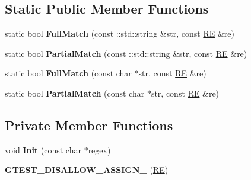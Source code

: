 \subsection*{Static Public Member Functions}
\begin{DoxyCompactItemize}
\item 
\mbox{\label{classtesting_1_1internal_1_1_r_e_aa79a950758d0f1d62f7762d1e9cefe86}} 
static bool {\bfseries Full\+Match} (const \+::std\+::string \&str, const \hyperlink{classtesting_1_1internal_1_1_r_e}{RE} \&re)
\item 
\mbox{\label{classtesting_1_1internal_1_1_r_e_a1e81f9a87211bdca645e025f8f0236c8}} 
static bool {\bfseries Partial\+Match} (const \+::std\+::string \&str, const \hyperlink{classtesting_1_1internal_1_1_r_e}{RE} \&re)
\item 
\mbox{\label{classtesting_1_1internal_1_1_r_e_a2b13ec1f6ccd6c32f7efa01e21588f0b}} 
static bool {\bfseries Full\+Match} (const char $\ast$str, const \hyperlink{classtesting_1_1internal_1_1_r_e}{RE} \&re)
\item 
\mbox{\label{classtesting_1_1internal_1_1_r_e_a97495dd4c2bb9589522823f060c8e8ba}} 
static bool {\bfseries Partial\+Match} (const char $\ast$str, const \hyperlink{classtesting_1_1internal_1_1_r_e}{RE} \&re)
\end{DoxyCompactItemize}
\subsection*{Private Member Functions}
\begin{DoxyCompactItemize}
\item 
\mbox{\label{classtesting_1_1internal_1_1_r_e_a4c3a519ce849abc57d6d5fffbf1e04dc}} 
void {\bfseries Init} (const char $\ast$regex)
\item 
\mbox{\label{classtesting_1_1internal_1_1_r_e_a6a07573fee776f88fe045d067dbebe18}} 
{\bfseries G\+T\+E\+S\+T\+\_\+\+D\+I\+S\+A\+L\+L\+O\+W\+\_\+\+A\+S\+S\+I\+G\+N\+\_\+} (\hyperlink{classtesting_1_1internal_1_1_r_e}{RE})
\end{DoxyCompactItemize}
